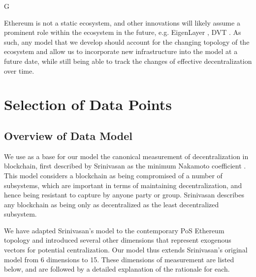 G\documentclass[conference]{IEEEtran}
\begin{document}
Ethereum is not a static ecosystem, and other innovations will likely assume a prominent role within the ecosystem in the future, e.g. EigenLayer \cite{eigenlayer2023}, DVT \cite{asgaonkar-2021}.  As such, any model that we develop should account for the changing topology of the ecosystem and allow us to incorporate new infrastructure into the model at a future date, while still being able to track the changes of effective decentralization over time.

\section{Selection of Data Points}

\subsection{Overview of Data Model}

We use as a base for our model the canonical measurement of decentralization in blockchain, first described by Srinivasan as the minimum Nakamoto coefficient \cite{srinivasan2018}.  This model considers a blockchain as being compromised of a number of subsystems, which are important in terms of maintaining decentralization, and hence being resistant to capture by anyone party or group.  Srinivasan describes any blockchain as being only as decentralized as the least decentralized subsystem. 

We have adapted Srinivasan's model to the contemporary PoS Ethereum topology and introduced several other dimensions that represent exogenous vectors for potential centralization.  Our model thus extends Srinivasan's original model from 6 dimensions to 15.  These dimensions of measurement are listed below, and are followed by a detailed explanation of the rationale for each.
\end{document}

